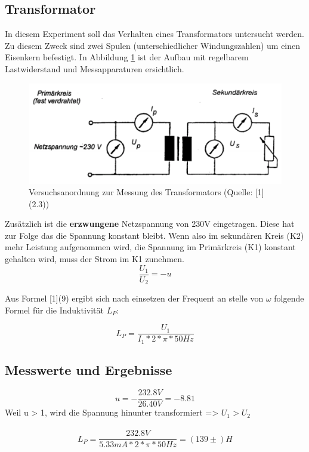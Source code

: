 \documentclass[12pt,a4paper]{article}
\begin{document}
\begin{multicols}{2}
\section{Transformator}
In diesem Experiment soll das Verhalten eines Transformators untersucht werden. Zu diesem Zweck sind zwei Spulen (unterschiedlicher Windungszahlen) um einen Eisenkern befestigt. In Abbildung \ref{fig:schaltung_trafo} ist der Aufbau mit regelbarem Lastwiderstand und Messapparaturen ersichtlich.

\begin{figure}[H]
	\centering
	\includegraphics[scale=0.40]{./figure/schaltskizze_trafo.png}
	\caption{Versuchsanordnung zur Messung des Transformators (Quelle: [1](2.3))}
	\label{fig:schaltung_trafo}
\end{figure}
\noindent
Zusätzlich ist die \textbf{erzwungene} Netzspannung von 230V eingetragen. Diese hat zur Folge das die Spannung konstant bleibt. Wenn also im sekundären Kreis (K2) mehr Leistung aufgenommen wird, die Spannung im Primärkreis (K1) konstant gehalten wird, muss der Strom im K1 zunehmen.\\

$$\frac{U_1}{U_2} = -u$$

\noindent
Aus Formel [1](9) ergibt sich nach einsetzen der Frequent an stelle von $\omega$ folgende Formel für die Induktivität $L_P$:

$$L_P = \frac{U_1}{I_1 * 2*\pi * 50Hz}$$

\subsection{Messwerte und Ergebnisse}

$$u = -\frac{232.8V}{26.40V} = -8.81$$
\noindent
Weil u > 1, wird die Spannung hinunter transformiert => $U_1 > U_2$ \\
\\
$$L_P = \frac{232.8V}{5.33mA *2*\pi * 50 Hz} = (139 \pm )H$$

\end{multicols}
\end{document}
